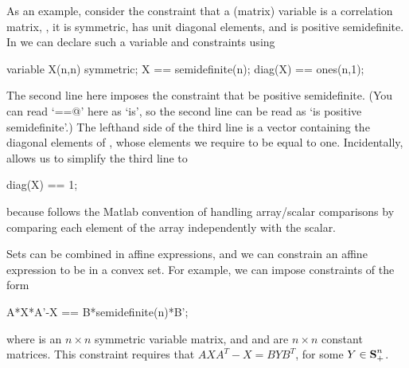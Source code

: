 \documentclass[12pt]{article}
\newcommand{\symm}{{\mbox{\bf S}}}  %
\begin{document}
As an example, consider the constraint
that a (matrix) variable \verb@X@ is a correlation
matrix, \ie, it is symmetric, has unit diagonal elements, and 
is positive semidefinite.  In \cvx we can declare such a variable
and constraints using
\begin{code}
	variable X(n,n) symmetric;
	X == semidefinite(n);
	diag(X) == ones(n,1);
\end{code}
The second line here imposes the constraint that \verb@X@
be positive semidefinite.
(You can read `\verb@==@' here as `is', so the second line can be 
read as `\verb@X@ is positive semidefinite'.)
The lefthand side of the third line
is a vector containing the diagonal elements of \verb@X@, whose 
elements we require to be equal to one. Incidentally, \cvx
allows us to simplify the third line to
\begin{code}
	diag(X) == 1;
\end{code}
because \cvx follows the Matlab convention of handling array/scalar
comparisons by comparing each element of the array independently with the scalar.

Sets can be combined in affine expressions, and we can constrain
an affine expression to be in a convex set.
For example, we can impose constraints of the form
\begin{code}
	A*X*A'-X == B*semidefinite(n)*B';
\end{code}
where \verb@X@ is an $n \times n$ symmetric variable matrix,
and \verb@A@ and \verb@B@ are $n \times n$  constant matrices.
This constraint requires that $AXA^T-X=BYB^T$, 
for some $Y \in \symm^n_+$.
\end{document}
